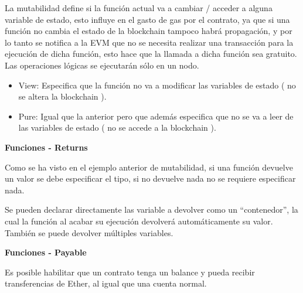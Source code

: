 La mutabilidad define si la función actual va a cambiar / acceder a alguna variable de estado, esto influye en el gasto de gas por el contrato, ya que si una función no cambia el estado de la blockchain tampoco habrá propagación, y por lo tanto se notifica a la EVM que no se necesita realizar una transacción para la ejecución de dicha función, esto hace que la llamada a dicha función sea gratuito. Las operaciones lógicas se ejecutarán sólo en un nodo.

\begin{itemize}
    \item View: Especifica que la función no va a modificar las variables de estado ( no se altera la blockchain ).

    \item Pure: Igual que la anterior pero que además especifica que no se va a leer de las variables de estado ( no se accede a la blockchain ).
\end{itemize}

\bigskip 



\newpage

\bigskip

\textbf{Funciones - Returns }

\bigskip

Como se ha visto en el ejemplo anterior de mutabilidad, si una función devuelve un valor se debe especificar el tipo, si no devuelve nada no se requiere especificar nada.

\bigskip 

Se pueden declarar directamente las variable a devolver como un “contenedor”, la cual la función al acabar su ejecución devolverá automáticamente su valor. También se puede devolver múltiples variables.

\bigskip 



\newpage

\bigskip

\textbf{Funciones - Payable }

\bigskip

Es posible habilitar que un contrato tenga un balance y pueda recibir transferencias de Ether, al igual que una cuenta normal.

\bigskip

